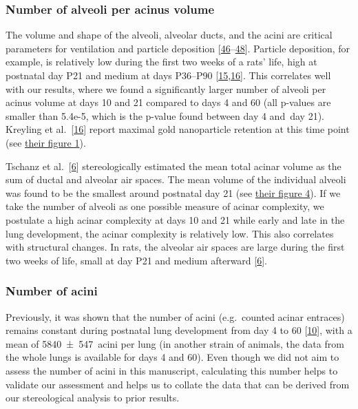\documentclass[
  american,
]{article}
\begin{document}
\hypertarget{number-of-alveoli-per-acinus-volume}{%
\subsubsection{Number of alveoli per acinus volume}\label{number-of-alveoli-per-acinus-volume}}

The volume and shape of the alveoli, alveolar ducts, and the acini are critical parameters for ventilation and particle deposition {[}\protect\hyperlink{ref-eioib1TQ}{46}--\protect\hyperlink{ref-OT4s1CSX}{48}{]}.
Particle deposition, for example, is relatively low during the first two weeks of a rats' life, high at postnatal day P21 and medium at days P36--P90 {[}\protect\hyperlink{ref-yHHhvOtP}{15},\protect\hyperlink{ref-18DcNLAv6}{16}{]}.
This correlates well with our results, where we found a significantly larger number of alveoli per acinus volume at days 10 and 21 compared to days 4 and 60 (all p-values are smaller than 5.4e-5, which is the p-value found between day 4 and~day 21).
Kreyling et al.~{[}\protect\hyperlink{ref-18DcNLAv6}{16}{]} report maximal gold nanoparticle retention at this time point (see \href{https://pubs.acs.org/doi/10.1021/acsnano.8b01826\#fig1}{their figure 1}).

Tschanz et al.~{[}\protect\hyperlink{ref-wnl86DEM}{6}{]} stereologically estimated the mean total acinar volume as the sum of ductal and alveolar air spaces.
The mean volume of the individual alveoli was found to be the smallest around postnatal day 21 (see \href{https://www.physiology.org/na101/home/literatum/publisher/physio/journals/content/jappl/2014/jappl.2014.117.issue-1/japplphysiol.01355.2013/production/images/medium/zdg0121410620004.jpeg}{their figure 4}).
If we take the number of alveoli as one possible measure of acinar complexity, we postulate a high acinar complexity at days 10 and 21 while early and late in the lung development, the acinar complexity is relatively low.
This also correlates with structural changes.
In rats, the alveolar air spaces are large during the first two weeks of life, small at day P21 and medium afterward {[}\protect\hyperlink{ref-wnl86DEM}{6}{]}.

\hypertarget{number-of-acini-1}{%
\subsubsection{Number of acini}\label{number-of-acini-1}}

Previously, it was shown that the number of acini (e.g.~counted acinar entraces) remains constant during postnatal lung development from day 4 to 60 {[}\protect\hyperlink{ref-14OP85b2F}{10}{]}, with a mean of 5840~±~547~acini per lung (in another strain of animals, the data from the whole lungs is available for days 4 and 60).
Even though we did not aim to assess the number of acini in this manuscript, calculating this number helps to validate our assessment and helps us to collate the data that can be derived from our stereological analysis to prior results.
\end{document}
